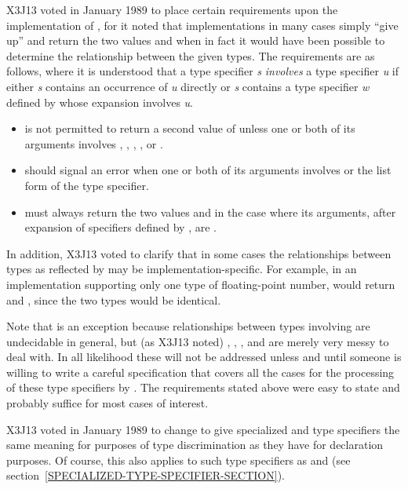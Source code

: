\begin{defun}[Function]
\begin{new}
X3J13 voted in January 1989
to place certain requirements upon the implementation of ,
for it noted that implementations in many cases simply ``give up''
and return the two values  and  when in fact it would have been
possible to determine the relationship between the given types.
The requirements are as follows, where it is understood that a type specifier \emph{s}
\emph{involves} a type specifier \emph{u} if either \emph{s} contains an occurrence of \emph{u}
directly or \emph{s} contains a type specifier \emph{w} defined by  whose
expansion involves \emph{u}.
\begin{itemize}
\item {} is not permitted to return a second value of 
unless one or both of its arguments involves ,
, , , or .
\item {} should signal an error when one or both of its arguments
involves  or the list form of the  type specifier.
\item {} must always return the two values  and 
in the case where its arguments, after expansion of specifiers
defined by , are .
\end{itemize}
In addition, X3J13 voted to clarify that in some cases
the relationships between types
as reflected by  may be implementation-specific.
For example, in an implementation supporting only one type of
floating-point number,  would return
 and , since the two types would be identical.

Note that  is an exception because relationships between
types involving  are undecidable in general, but (as X3J13 noted)
, , , and  are merely very messy to deal
with.  In all likelihood these will not be addressed unless and
until someone is willing to write a careful specification that covers
all the cases for the processing of these type
specifiers by .  The requirements stated above were easy
to state and probably suffice for most cases of interest.
\end{new}

\begin{new}
X3J13 voted in January 1989
to change  to give specialized
 and  type specifiers the same meaning for
purposes of type discrimination as they have for declaration purposes.
Of course, this also applies to such type specifiers as 
and 
(see section~\ref{SPECIALIZED-TYPE-SPECIFIER-SECTION}).


\end{new}
\end{defun}
